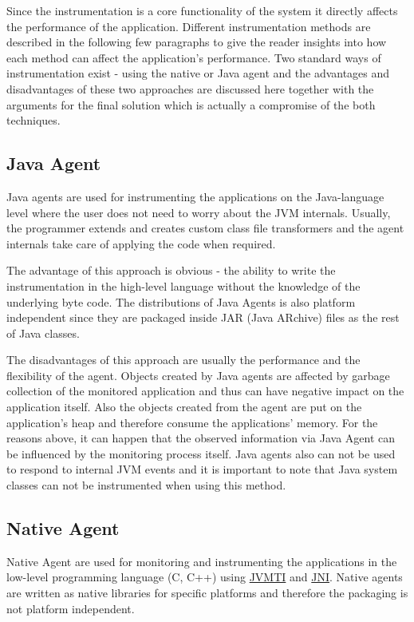 Since the instrumentation is a core functionality of the system it directly affects the performance of the application. Different instrumentation methods are described in the following few paragraphs to give the reader insights into how each method can affect the application's performance. Two standard ways of instrumentation exist - using the native or Java agent and the advantages and disadvantages of these two approaches are discussed here together with the arguments for the final solution which is actually a compromise of the both techniques.
\subsection{Java Agent}
\label{java_agent}
Java agents are used for instrumenting the applications on the Java-language level where the user does not need to worry about the JVM internals. Usually, the programmer extends and creates custom class file transformers and the agent internals take care of applying the code when required. 

The advantage of this approach is obvious - the ability to write the instrumentation in the high-level language without the knowledge of the underlying byte code. The distributions of Java Agents is also platform independent since they are packaged inside JAR (Java ARchive) files as the rest of Java classes. 

The disadvantages of this approach are usually the performance and the flexibility of the agent. Objects created by Java agents are affected by garbage collection of the monitored application and thus can have negative impact on the application itself. Also the objects created from the agent are put on the application's heap and therefore consume the applications' memory. For the reasons above, it can happen that the observed information via Java Agent can be influenced by the monitoring process itself. Java agents also can not be used to respond to internal JVM events and it is important to note that Java system classes can not be instrumented when using this method.
\subsection{Native Agent}
Native Agent are used for monitoring and instrumenting the applications in the low-level programming language (C, C++) using \hyperref[JVMTI]{JVMTI} and \hyperref[JNI]{JNI}. Native agents are written as native libraries for specific platforms and therefore the packaging is not platform independent. 

